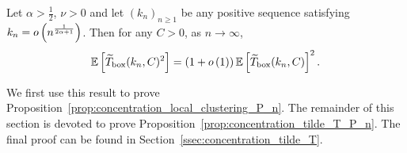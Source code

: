 %

\begin{proposition}\label{prop:concentration_tilde_T_P_n}
Let $\alpha > \frac{1}{2}$, $\nu > 0$ and let $(k_n)_{n \ge 1}$ be any positive sequence satisfying $k_n = o\left(n^{\frac{1}{2\alpha+1}}\right)$. Then for any $C > 0$, as $n \to \infty$,
\[
	\mathbb{E}\left[\widetilde{T}_{\text{box}}(k_n,C)^2\right] = \left(1 + o\left(1\right)\right)\mathbb{E}\left[\widetilde{T}_{\text{box}}(k_n, C)\right]^2.
\]
\end{proposition}

We first use this result to prove Proposition~\ref{prop:concentration_local_clustering_P_n}. The remainder of this section is devoted to prove Proposition~\ref{prop:concentration_tilde_T_P_n}. The final proof can be found in Section~\ref{ssec:concentration_tilde_T}.

